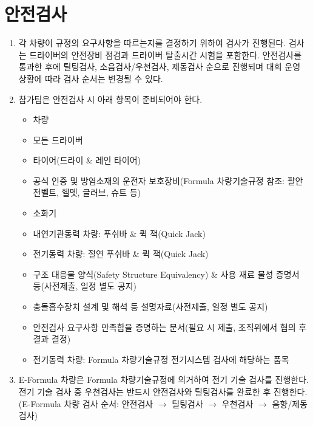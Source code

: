 \documentclass[final,a4paper,10pt]{report}
\begin{document}
\section{안전검사}\label{rule:formula-competition.safety-inspection}
\begin{enumerate}
  \item\label{rule:formula-competition.safety-inspection.scope-and-test-sequence} 각 차량이 규정의 요구사항을 따르는지를 결정하기 위하여 검사가 진행된다. 검사는 드라이버의 안전장비 점검과 드라이버 탈출시간 시험을 포함한다. 안전검사를 통과한 후에 틸팅검사, 소음검사/우천검사, 제동검사 순으로 진행되며 대회 운영 상황에 따라 검사 순서는 변경될 수 있다.
  \item\label{rule:formula-competition.safety-inspection.pre-inspection-checklist} 참가팀은 안전검사 시 아래 항목이 준비되어야 한다.
    \begin{itemize}
      \item 차량
      \item 모든 드라이버
      \item 타이어(드라이 \& 레인 타이어)
      \item 공식 인증 및 방염소재의 운전자 보호장비(Formula 차량기술규정 참조: 팔안전벨트, 헬멧, 글러브, 슈트 등)
      \item 소화기
      \item 내연기관동력 차량: 푸쉬바 \& 퀵 잭(Quick Jack)
      \item 전기동력 차량: 절연 푸쉬바 \& 퀵 잭(Quick Jack)
      \item 구조 대응물 양식(Safety Structure Equivalency) \& 사용 재료 물성 증명서 등(사전제출, 일정 별도 공지)
      \item 충돌흡수장치 설계 및 해석 등 설명자료(사전제출, 일정 별도 공지)
      \item 안전검사 요구사항 만족함을 증명하는 문서(필요 시 제출, 조직위에서 협의 후 결과 결정)
      \item 전기동력 차량: Formula 차량기술규정 전기시스템 검사에 해당하는 품목
    \end{itemize}
  \item\label{rule:formula-competition.safety-inspection.e-formula-test-sequence} E-Formula 차량은 Formula 차량기술규정에 의거하여 전기 기술 검사를 진행한다. 전기 기술 검사 중 우천검사는 반드시 안전검사와 틸팅검사를 완료한 후 진행한다.\\
    (E-Formula 차량 검사 순서: 안전검사 $\rightarrow$ 틸팅검사 $\rightarrow$ 우천검사 $\rightarrow$ 음향/제동검사)
\end{enumerate}
\end{document}
